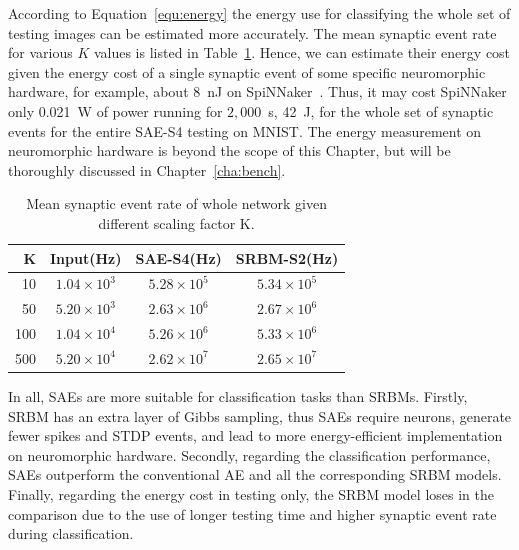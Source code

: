 According to Equation~\ref{equ:energy} the energy use for classifying the whole set of testing images can be estimated more accurately.
The mean synaptic event rate for various $K$ values is listed in Table~\ref{tbl:fire_rate}.
Hence, we can estimate their energy cost given the energy cost of a single synaptic event of some specific neuromorphic hardware, for example, about 8~nJ on SpiNNaker~\citep{stromatias2013power}.
Thus, it may cost SpiNNaker only 0.021~W of power running for $2,000$~s, 42~J, for the whole set of synaptic events for the entire SAE-S4 testing on MNIST.
The energy measurement on neuromorphic hardware is beyond the scope of this Chapter, but will be thoroughly discussed in Chapter~\ref{cha:bench}.
\begin{table}[htbp]
	\centering
	\caption{\label{tbl:fire_rate}Mean synaptic event rate of whole network given different scaling factor K.}
	\bgroup
	\def\arraystretch{1.4}
	\begin{tabular}{r c c c}
		K & Input(Hz) & SAE-S4(Hz) & SRBM-S2(Hz)\\
		\hline
		10 & $1.04 \times 10^3$ & $5.28 \times 10^5$ & $5.34 \times 10^5$ \\
		50 & $5.20 \times 10^3$ & $2.63 \times 10^6$ & $2.67 \times 10^6$ \\
		100 & $1.04 \times 10^4$ & $5.26 \times 10^6$ & $5.33 \times 10^6$ \\
		500 & $5.20 \times 10^4$ & $2.62 \times 10^7$ & $2.65 \times 10^7$ \\
	\end{tabular}
	\egroup
\end{table}

In all, SAEs are more suitable for classification tasks than SRBMs.
Firstly, \DIFaddbegin {}\DIFaddend SRBM has an extra layer of Gibbs sampling, thus SAEs require \DIFdelbegin {}\DIFdelend \DIFaddbegin {}\DIFaddend neurons, generate fewer spikes and STDP events, and lead to \DIFaddbegin {}\DIFaddend more energy-efficient implementation on neuromorphic hardware.
Secondly, regarding the classification performance, SAEs outperform the conventional AE and all the corresponding SRBM models.
Finally, regarding the energy cost in testing only, the SRBM model loses in the comparison due to the use of longer testing time and higher synaptic event rate during classification.

